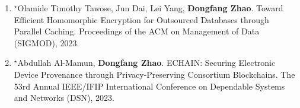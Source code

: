 \documentclass[11pt]{scrartcl}
\begin{document}
\begin{enumerate}


\item $^\star$Olamide Timothy Tawose, Jun Dai, Lei Yang, \textbf{Dongfang Zhao}.
Toward Efficient Homomorphic Encryption for Outsourced Databases through Parallel Caching. 
Proceedings of the ACM on Management of Data (SIGMOD), 2023.




\item 	$^\star$Abdullah Al-Mamun, \textbf{Dongfang Zhao}.
ECHAIN: Securing Electronic Device Provenance through Privacy-Preserving Consortium Blockchains. 
The 53rd Annual IEEE/IFIP International Conference on Dependable Systems and Networks (DSN), 2023.



\end{enumerate}
\end{document}
